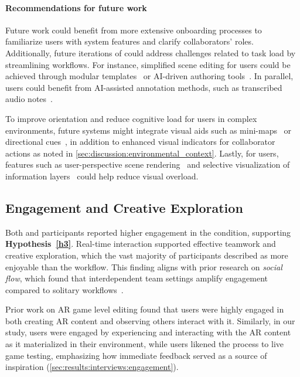 \paragraph{\textbf{Recommendations for future work}}
Future work could benefit from more extensive onboarding processes to familiarize users with system features and clarify collaborators' roles. Additionally, future iterations of \SystemName could address challenges related to task load by streamlining workflows. For instance, simplified scene editing for \exsitu{} users could be achieved through modular templates~\cite{jurgelionisShapesMarblesPebbles2012} or AI-driven authoring tools~\cite{seeligerContextAdaptiveVisualCues2024,qianScalARAuthoringSemantically2022,evangelistabeloAUITAdaptiveUser2022}. In parallel, \insitu{} users could benefit from AI-assisted annotation methods, such as transcribed audio notes~\cite{langlotzAudioStickiesVisuallyguided2013,kimWinderLinkingSpeech2021}.

To improve orientation and reduce cognitive load for \insitu{} users in complex environments, future systems might integrate visual aids such as mini-maps~\cite{stoakleyVirtualRealityWIM1995} or directional cues~\cite{leeUserPreferenceNavigation2022}, in addition to enhanced visual indicators for collaborator actions as noted in \cref{sec:discussion:environmental_context}. Lastly, for \exsitu{} users, features such as user-perspective scene rendering~\cite{baricevicHandheldARMagic2012} and selective visualization of information layers~\cite{kerstenUsingTaskContext2006,veasExtendedOverviewTechniques2012} could help reduce visual overload.

\subsection{Engagement and Creative Exploration}\label{sec:discussion:engagement}
Both \exsitu and \insitu participants reported higher engagement in the \sync condition, supporting \textbf{Hypothesis~\ref{h3}}. Real-time interaction supported effective teamwork and creative exploration, which the vast majority of participants described as more enjoyable than the \async workflow. This finding aligns with prior research on \textit{social flow}, which found that interdependent team settings amplify engagement compared to solitary workflows~\cite{walkerExperiencingFlowDoing2010}.

Prior work on \insitu AR game level editing \cite{ngSituatedGameLevel2018} found that users were highly engaged in both creating AR content and observing others interact with it. Similarly, in our study, \insitu users were engaged by experiencing and interacting with the AR content as it materialized in their environment, while \exsitu users likened the process to live game testing, emphasizing how immediate \insitu feedback served as a source of inspiration (\cref{sec:results:interviews:engagement}).

